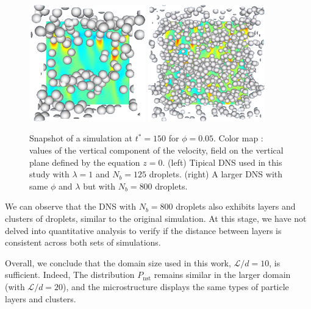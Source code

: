 \begin{figure}[h!]
    \centering
    \includegraphics[width=0.45\textwidth]{image/HOMOGENEOUS_NEW/P_PHI_5_l_10_Ga_100.png}
    \includegraphics[width=0.45\textwidth]{image/HOMOGENEOUS_final/Ga_80_phi_005_l_1.png}
    \caption{Snapshot of a simulation at $t^* = 150$ for $\phi=0.05$.
    Color map : values of the vertical component of the velocity, field on the vertical plane defined by the equation $z=0$. 
    (left)  Tipical DNS used in this study  with $\lambda = 1$ and $N_b = 125$ droplets.
    (right) A larger DNS with same $\phi$ and  $\lambda$ but with $N_b = 800$ droplets.
    }
    \label{fig:images_deux}
\end{figure}
We can observe that the DNS with $N_b = 800$ droplets also exhibits layers and clusters of droplets, similar to the original simulation. 
At this stage, we have not delved into quantitative analysis to verify if the distance between layers is consistent across both sets of simulations. 

Overall, we conclude that the domain size used in this work, $\mathcal{L}/d = 10$, is sufficient. 
Indeed, The distribution $P_\text{nst}$ remains similar in the larger domain (with $\mathcal{L}/d = 20$), and the microstructure displays the same types of particle layers and clusters.